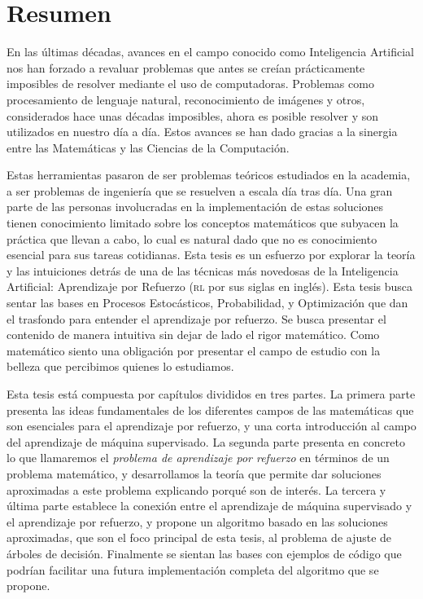 \chapter*{Resumen}
En las últimas décadas, avances en el campo conocido como Inteligencia
Artificial nos han forzado a revaluar problemas que antes se creían
prácticamente imposibles de resolver mediante el uso de computadoras. Problemas
como procesamiento de lenguaje natural, reconocimiento de imágenes y otros,
considerados hace unas décadas imposibles, ahora es posible resolver y son
utilizados en nuestro día a día. Estos avances se han dado gracias a la sinergia
entre las Matemáticas y las Ciencias de la Computación.

Estas herramientas pasaron de ser problemas teóricos estudiados en la
a\-ca\-de\-mi\-a, a ser problemas de ingeniería que se resuelven a escala día
tras día. Una gran parte de las personas involucradas en la implementación de
estas soluciones tienen conocimiento limitado sobre los conceptos matemáticos
que subyacen la práctica que llevan a cabo, lo cual es natural dado que no es
conocimiento esencial para sus tareas cotidianas. Esta tesis es un esfuerzo por
explorar la teoría y las intuiciones detrás de una de las técnicas más novedosas
de la Inteligencia Artificial: Aprendizaje por Refuerzo (\textsc{rl} por sus
siglas en inglés). Esta tesis busca sentar las bases en Procesos Estocásticos,
Probabilidad, y Optimización que dan el trasfondo para entender el aprendizaje
por refuerzo. Se busca presentar el contenido de manera intuitiva sin dejar de
lado el rigor matemático. Como matemático siento una obligación por presentar el
campo de estudio con la belleza que percibimos quienes lo estudiamos.

Esta tesis está compuesta por capítulos divididos en tres partes. La primera
parte presenta las ideas fundamentales de los diferentes campos de las
matemáticas que son esenciales para el aprendizaje por refuerzo, y una corta
introducción al campo del aprendizaje de máquina supervisado. La segunda parte
presenta en concreto lo que llamaremos el \emph{problema de aprendizaje por
refuerzo} en términos de un problema matemático, y desarrollamos la teoría que
permite dar soluciones aproximadas a este problema explicando porqué son de
interés. La tercera y última parte establece la conexión entre el aprendizaje de
máquina supervisado y el aprendizaje por refuerzo, y propone un algoritmo basado
en las soluciones aproximadas, que son el foco principal de esta tesis, al
problema de ajuste de árboles de decisión. Finalmente se sientan las bases con
ejemplos de código que podrían facilitar una futura implementación completa del
algoritmo que se propone.

